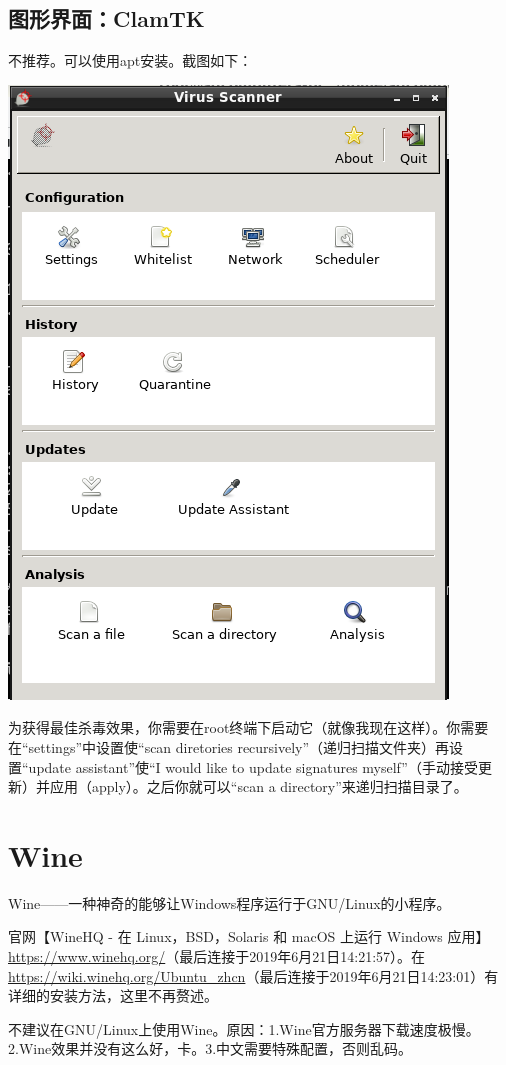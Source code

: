 \documentclass{book}
\begin{document}
\subsection{图形界面：ClamTK}
不推荐。可以使用apt安装。截图如下：
\begin{center}
	\includegraphics[scale=0.5]{pic/ctk}
\end{center}
为获得最佳杀毒效果，你需要在root终端下启动它（就像我现在这样）。你需要在“settings”中设置使“scan diretories recursively”（递归扫描文件夹）再设置“update assistant”使“I would like to update signatures myself”（手动接受更新）并应用（apply）。之后你就可以“scan a directory”来递归扫描目录了。
\section{Wine}
Wine——一种神奇的能够让Windows程序运行于GNU/Linux的小程序。\par
官网【WineHQ - 在 Linux，BSD，Solaris 和 macOS 上运行 Windows 应用】\url{https://www.winehq.org/}（最后连接于2019年6月21日14:21:57）。在\url{https://wiki.winehq.org/Ubuntu_zhcn}（最后连接于2019年6月21日14:23:01）有详细的安装方法，这里不再赘述。\par
不建议在GNU/Linux上使用Wine。原因：1.Wine官方服务器下载速度极慢。2.Wine效果并没有这么好，卡。3.中文需要特殊配置，否则乱码。
\end{document}
